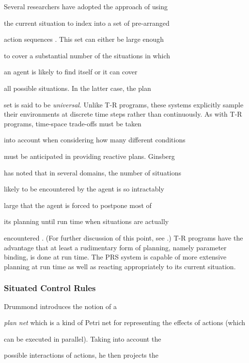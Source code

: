  

Several researchers have adopted the approach of using 

the current situation to index into a set of pre-arranged 

action sequences   \cite{Georgeff,Schoppers,Firby}.  This set can either be  
large enough 

to cover a substantial number of the situations in which 

an agent is likely to find itself or it can cover 

all possible situations.  In the latter case, the plan 

set is said to be {\it universal}.  Unlike T-R programs, these systems
explicitly sample their environments at discrete time steps rather than  
continuously.  As  with T-R programs, time-space trade-offs must be taken 

into account when considering how many different conditions 

must be anticipated in providing reactive plans.  Ginsberg 

has noted that in several domains, the number of situations 

likely to be encountered by the agent is so intractably 

large that the agent is forced to postpone most of 

its planning until run time when  situations are actually 

encountered \cite{Ginsberg}.  (For further discussion of this point, see  
\cite{Selman}.)  T-R programs have the advantage that at least a rudimentary  
form of planning, namely parameter binding, is done at run time.  The PRS  
system \cite{Georgeff} is capable of more extensive planning at run time as  
well as reacting appropriately to its current situation.


\subsubsection{Situated Control Rules}

Drummond \cite{Drummond} introduces the notion of a 

{\it plan net}  which is a kind of Petri net \cite{Reisig} for representing  
the effects of actions (which 

can be executed in parallel).  Taking into account the 

possible interactions of actions, he then projects the 

